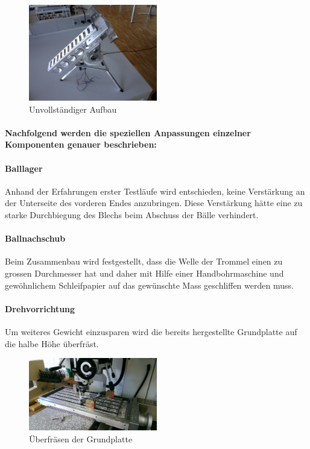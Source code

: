 \begin{figure}[h!]          
	\centering             
	\includegraphics[width=0.5\textwidth]{fig/IMG_2303.JPG}
	\caption{Unvollständiger Aufbau}
	\label{fig:Unvollständiger Aufbau}        
\end{figure}

\paragraph{Nachfolgend werden die speziellen Anpassungen einzelner Komponenten genauer beschrieben:}

\paragraph{Balllager}
Anhand der Erfahrungen erster Testläufe wird entschieden, keine Verstärkung an 
der Unterseite des vorderen Endes anzubringen. Diese Verstärkung hätte eine zu 
starke Durchbiegung des Blechs beim Abschuss der Bälle verhindert.

\paragraph{Ballnachschub}
Beim Zusammenbau wird festgestellt, dass die Welle der Trommel einen zu 
grossen Durchmesser hat und daher mit Hilfe einer Handbohrmaschine und 
gewöhnlichem Schleifpapier auf das gewünschte Mass geschliffen werden muss.

\paragraph{Drehvorrichtung}
Um weiteres Gewicht einzusparen wird die bereits hergestellte Grundplatte auf die halbe Höhe überfräst.

\begin{figure}[h!]          
	\centering             
	\includegraphics[width=0.5\textwidth]{fig/IMAG0357.jpg}
	\caption{Überfräsen der Grundplatte}
	\label{fig:Grundplatte fräsen}        
\end{figure}

